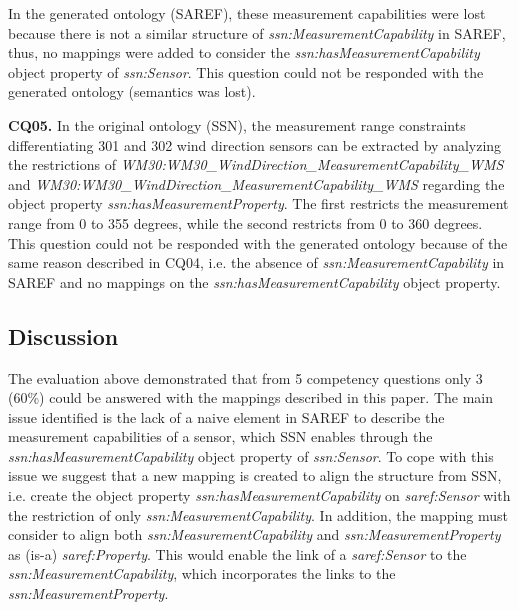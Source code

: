 \documentclass{sig-alternate-05-2015}
\begin{document}
In the generated ontology (SAREF), these measurement capabilities were lost because there is not a similar structure of \textit{ssn:\-MeasurementCapability} in SAREF, thus, no mappings were added to consider the  \textit{ssn:\-hasMeasurementCapability} object property of \textit{ssn:\-Sensor}. This question could not be responded with the generated ontology (semantics was lost).  

\noindent
\textbf{CQ05.} In the original ontology (SSN), the measurement range constraints differentiating 301 and 302 wind direction sensors can be extracted by analyzing the restrictions of \textit{WM30:\-WM30\-\_Wind\-Direction\-\_Measurement\-Capability\-\_WMS} and \textit{WM30:\-WM30\-\_Wind\-Direction\-\_Measurement\-Capability\-\_WMS} regarding the object property \textit{ssn:\-has\-Measurement\-Property}. The first restricts the measurement range from 0 to 355 degrees, while the second restricts from 0 to 360 degrees. This question could not be responded with the generated ontology because of the same reason described in CQ04, i.e. the absence of \textit{ssn:\-MeasurementCapability} in SAREF and no mappings on the \textit{ssn:\-hasMeasurementCapability} object property.


\subsection{Discussion}

The evaluation above demonstrated that from 5 competency questions only 3 (60\%) could be answered with the mappings described in this paper. The main issue identified is the lack of a naive element in SAREF to describe the measurement capabilities of a sensor, which SSN enables through the \textit{ssn:\-hasMeasurementCapability} object property of \textit{ssn:\-Sensor}. To cope with this issue we suggest that a new mapping is created to align the structure from SSN, i.e. create the object property \textit{ssn:\-has\-Measurement\-Capability} on \textit{saref:\-Sensor} with the restriction of only \textit{ssn:MeasurementCapability}. In addition, the mapping must consider to align both \textit{ssn:\-Measurement\-Capability} and \textit{ssn:\-Measurement\-Property} as (is-a) \textit{saref:\-Property}. This would enable the link of a \textit{saref:\-Sensor} to the \textit{ssn:\-Measurement\-Capability}, which incorporates the links to the \textit{ssn:\-Measurement\-Property}. 
\end{document}
